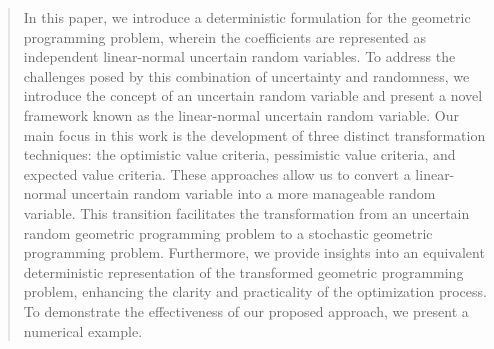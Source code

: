 
\author{Tapas Mondal \and
 Akshay Kumar Ojha \and Sabyasachi Pani%
}


\author{Tapas Mondal* \and Akshay Kumar Ojha \and Sabyasachi Pani }

\date{Received: date / Accepted: date}


\maketitle

\begin{abstract}
In this paper, we introduce a deterministic formulation for the geometric programming problem, wherein the coefficients are represented as independent linear-normal uncertain random variables. To address the challenges posed by this combination of uncertainty and randomness, we introduce the concept of an uncertain random variable and present a novel framework known as the linear-normal uncertain random variable. Our main focus in this work is the development of three distinct transformation techniques: the optimistic value criteria, pessimistic value criteria, and expected value criteria. These approaches allow us to convert a linear-normal uncertain random variable into a more manageable random variable. This transition facilitates the transformation from an uncertain random geometric programming problem to a stochastic geometric programming problem. Furthermore, we provide insights into an equivalent deterministic representation of the transformed geometric programming problem, enhancing the clarity and practicality of the optimization process. To demonstrate the effectiveness of our proposed approach, we present a numerical example.\\
\end{abstract}
